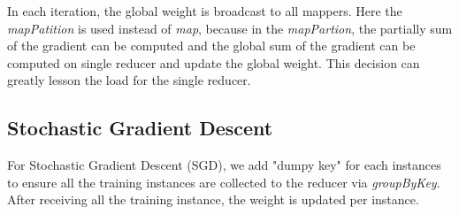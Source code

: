 \documentclass[sigconf]{acmart}
\begin{document}
In each iteration, the global weight is broadcast to all mappers. Here the \textit{mapPatition} is used instead of \textit{map}, because in the \textit{mapPartion}, the partially sum of the gradient can be computed and the global sum of the gradient can be computed on single reducer and update the global weight. This decision can greatly lesson the load for the single reducer.





\subsection{Stochastic Gradient Descent}
\label{sec:implementationSGD}

For Stochastic Gradient Descent (SGD), we add "dumpy key" for each instances to ensure all the training instances are collected to the reducer via \textit{groupByKey}. After receiving all the training instance, the weight is updated per instance. 
\end{document}
